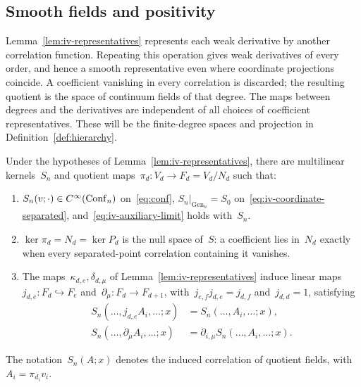 \subsection{Smooth fields and positivity}\label{subsec:iv-smoothness}

Lemma~\ref{lem:iv-representatives} represents each weak derivative by another correlation function.
Repeating this operation gives weak derivatives of every order, and hence a smooth representative even where coordinate projections coincide.
A coefficient vanishing in every correlation is discarded; the resulting quotient is the space of continuum fields of that degree.
The maps between degrees and the derivatives are independent of all choices of coefficient representatives.
These will be the finite-degree spaces and projection in Definition~\ref{def:hierarchy}.

\begin{proposition}\label{prop:iv-smooth}
Under the hypotheses of Lemma~\ref{lem:iv-representatives}, there are multilinear kernels~$S_n$ and quotient maps~$\pi_d:V_d\to F_d=V_d/N_d$ such that:
\begin{enumerate}[label=\textup{(\roman*)},ref=\theproposition(\roman*)]
\item\label{item:iv-smooth-limits} $S_n(v;\cdot)\in C^\infty(\operatorname{Conf}_{n})$ on~\eqref{eq:conf},
$S_n|_{\operatorname{Gen}_n}=S_0$ on~\eqref{eq:iv-coordinate-separated}, and~\eqref{eq:iv-auxiliary-limit} holds with~$S_n$.
\item\label{item:iv-smooth-null} $\ker\pi_d=N_d=\ker P_d$ is the null space of~$S$: a coefficient lies in~$N_d$ exactly when every separated-point correlation containing it vanishes.
\item\label{item:iv-smooth-operations} The maps~$\kappa_{d,e},\delta_{d,\mu}$ of Lemma~\ref{lem:iv-representatives} induce linear maps~$j_{d,e}:F_d\hookrightarrow F_e$ and~$\partial_\mu:F_d\to F_{d+1}$, with~$j_{e,f}j_{d,e}=j_{d,f}$ and~$j_{d,d}=1$, satisfying
\begin{equation}\label{eq:iv-field-derivative}
\begin{aligned}
 S_n(\ldots,j_{d,e}A_i,\ldots;x)&=S_n(\ldots,A_i,\ldots;x),\\
 S_n(\ldots,\partial_\mu A_i,\ldots;x)&=\partial_{i,\mu}S_n(\ldots,A_i,\ldots;x).
\end{aligned}
\end{equation}
\end{enumerate}
The notation~$S_n(A;x)$ denotes the induced correlation of quotient fields, with~$A_i=\pi_{d_i}v_i$.
\end{proposition}

